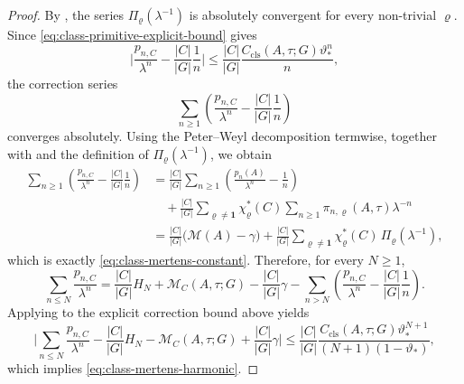 \documentclass[11pt,a4paper]{amsart}
\theoremstyle{plain}
\theoremstyle{definition}
\theoremstyle{remark}
\newcommand{\abs}[1]{\lvert #1 \rvert}
\begin{document}
\begin{proof}
  By , the series
  \(\Pi_\varrho(\lambda^{-1})\) is absolutely convergent for every
  non-trivial \(\varrho\). Since
  \eqref{eq:class-primitive-explicit-bound} gives
  \[
    \abs{
      \frac{p_{n,C}}{\lambda^n}
      -\frac{|C|}{|G|}\frac{1}{n}
    }
    \le
    \frac{|C|}{|G|}
    \frac{C_{\mathrm{cls}}(A,\tau;G)\vartheta_*^n}{n},
  \]
  the correction series
  \[
    \sum_{n\ge 1}
      \left(
        \frac{p_{n,C}}{\lambda^n}
        -\frac{|C|}{|G|}\frac{1}{n}
      \right)
  \]
  converges absolutely. Using the Peter--Weyl decomposition termwise,
  together with  and the definition of
  \(\Pi_\varrho(\lambda^{-1})\), we obtain
  \begin{align*}
    \sum_{n\ge 1}
      \left(
        \frac{p_{n,C}}{\lambda^n}
        -\frac{|C|}{|G|}\frac{1}{n}
      \right)
    &=
    \frac{|C|}{|G|}
      \sum_{n\ge 1}
        \left(
          \frac{p_n(A)}{\lambda^n}-\frac{1}{n}
        \right) \\
    &\quad
    +
    \frac{|C|}{|G|}
      \sum_{\varrho\neq\mathbf 1}
        \chi_\varrho^\ast(C)
        \sum_{n\ge 1}\pi_{n,\varrho}(A,\tau)\lambda^{-n} \\
    &=
    \frac{|C|}{|G|}\bigl(\mathcal M(A)-\gamma\bigr)
    +\frac{|C|}{|G|}
      \sum_{\varrho\neq\mathbf 1}
        \chi_\varrho^\ast(C)\,\Pi_\varrho(\lambda^{-1}),
  \end{align*}
  which is exactly
  \eqref{eq:class-mertens-constant}. Therefore, for every \(N\ge 1\),
  \[
    \sum_{n\le N}\frac{p_{n,C}}{\lambda^n}
    =
    \frac{|C|}{|G|}H_N
    +\mathcal M_C(A,\tau;G)-\frac{|C|}{|G|}\gamma
    -\sum_{n>N}
      \left(
        \frac{p_{n,C}}{\lambda^n}
        -\frac{|C|}{|G|}\frac{1}{n}
      \right).
  \]
  Applying  to the explicit
  correction bound above yields
  \[
    \abs{
      \sum_{n\le N}\frac{p_{n,C}}{\lambda^n}
      -\frac{|C|}{|G|}H_N
      -\mathcal M_C(A,\tau;G)+\frac{|C|}{|G|}\gamma
    }
    \le
    \frac{|C|}{|G|}
    \frac{
      C_{\mathrm{cls}}(A,\tau;G)\vartheta_*^{N+1}
    }{
      (N+1)(1-\vartheta_*)
    },
  \]
  which implies \eqref{eq:class-mertens-harmonic}.
\end{proof}
\end{document}
